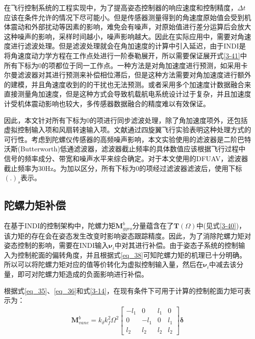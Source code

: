 在飞行控制系统的工程实现中，为了提高姿态控制器的响应速度和控制精度，$\Delta t$应该在条件允许的情况下尽可能小。但是传感器测量得到的角速度原始值会受到机体震动和外部扰动等因素的影响，难免会有噪声，对原始值进行差分运算后会放大这种噪声的影响，采样时间越小，噪声影响越大。因此在实际应用中，需要对角速度进行滤波处理。但是滤波处理就会在角加速度的计算中引入延迟，由于INDI是将角速度动力学方程在工作点处进行一阶泰勒展开，所以需要保证展开式\eqref{3-41}中所有下标为0的项都位于同一工作点。一种方法是对角加速度进行预测，如采用卡尔曼滤波器对其进行预测来补偿相位滞后，但是这种方法需要对角加速度进行额外的建模，并且角速度收到的的干扰也无法预测。或者采用多个加速度计数据融合来直接测量角加速度，但是这种方式会导致机载航电系统设计过于复杂，并且加速度计受机体震动影响也较大，多传感器数据融合的精度难以有效保证。

因此，本文针对所有下标为0的项进行同步滤波处理，除了角加速度项外，还包括虚拟控制输入项和风扇转速输入项。文献\parencite{smeurAdaptiveIncrementalNonlinear2015,smeurCascadedIncrementalNonlinear2018b}通过四旋翼飞行实验表明这种处理方式的可行性。考虑到陀螺仪传感器的高频噪声影响，本文实验使用的滤波器是二阶巴特沃斯(Butterworth)低通滤波器，滤波器截止频率的具体数值应该根据飞行过程中信号的频率成分、带宽和噪声水平来综合确定。对于本文使用的DFUAV，滤波器截止频率为30Hz。为加以区分，所有下标为0的项经过滤波器滤波后，使用下标$(.)_s$表示。

\subsection{陀螺力矩补偿}

在基于INDI的控制架构中，陀螺力矩$\boldsymbol{M}_{gyro}^b$分量蕴含在了$\boldsymbol{T}(\Omega)$中(见式\eqref{3-40})，该力矩的存在会在姿态发生改变时影响姿态跟踪精度。因此，为了消除陀螺力矩对姿态控制的影响，需要在INDI输入$\boldsymbol{\nu}_i$中对其进行补偿。由于姿态子系统的控制输入为控制舵面的偏转角度，并且根据式\eqref{eq_38}可知陀螺力矩的机理已十分明确。所以可以将陀螺力矩对应的值等价转化为虚拟控制输入量，然后在$\boldsymbol{\nu}_i$中减去该分量，即可对陀螺力矩造成的负面影响进行补偿。

根据式\eqref{eq_35}、\eqref{eq_36}和式\eqref{3-14}，在现有条件下可用于计算的控制舵面力矩可表示为：
\begin{gather}
    \boldsymbol{M}_{vane}^b=k_{\delta}k_f^2\Omega^2\begin{bmatrix}
        -l_1 & 0 & l_1 & 0 \\
        0 & -l_1 & 0 & l_1 \\
        l_2 & l_2 & l_2 & l_2
        \end{bmatrix}\boldsymbol{{\delta}}
    \label{3-50}
\end{gather}

